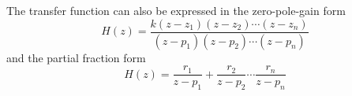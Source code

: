 The transfer function can also be expressed in the
zero-pole-gain form
\[H(z) = \frac{k(z-z_1)(z-z_2)\cdots(z-z_n)}{(z-p_1)(z-p_2)\cdots(z-p_n)}\]
and the partial fraction form
\[H(z) = \frac{r_1}{z-p_1}+\frac{r_2}{z-p_2}\cdots\frac{r_n}{z-p_n}\]
\endinput
